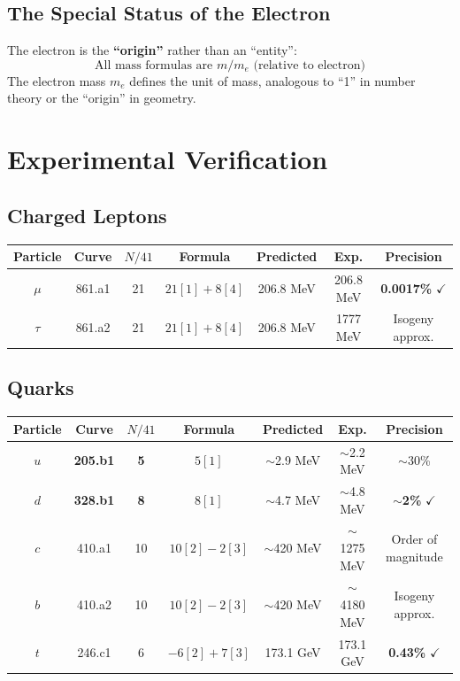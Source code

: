 ﻿\documentclass[11pt,a4paper]{article}
\begin{document}
\subsection{The Special Status of the Electron}

The electron is the \textbf{``origin''} rather than an ``entity'':
\begin{equation}
    \text{All mass formulas are } m/m_e \text{ (relative to electron)}
\end{equation}
The electron mass $m_e$ defines the unit of mass, analogous to ``1'' in number theory or the ``origin'' in geometry.

\section{Experimental Verification}

\subsection{Charged Leptons}

\begin{table}[h]
\centering
\begin{tabular}{@{}ccccccc@{}}
\toprule
\textbf{Particle} & \textbf{Curve} & $N/41$ & \textbf{Formula} & \textbf{Predicted} & \textbf{Exp.} & \textbf{Precision} \\
\midrule
$\mu$ & 861.a1 & 21 & $21[1]+8[4]$ & 206.8 MeV & 206.8 MeV & \textbf{0.0017\%} $\checkmark$ \\
$\tau$ & 861.a2 & 21 & $21[1]+8[4]$ & 206.8 MeV & 1777 MeV & Isogeny approx. \\
\bottomrule
\end{tabular}
\end{table}

\subsection{Quarks}

\begin{table}[h]
\centering
\begin{tabular}{@{}ccccccc@{}}
\toprule
\textbf{Particle} & \textbf{Curve} & $N/41$ & \textbf{Formula} & \textbf{Predicted} & \textbf{Exp.} & \textbf{Precision} \\
\midrule
$u$ & \textbf{205.b1} & \textbf{5} & $5[1]$ & $\sim$2.9 MeV & $\sim$2.2 MeV & $\sim$30\% \\
$d$ & \textbf{328.b1} & \textbf{8} & $8[1]$ & $\sim$4.7 MeV & $\sim$4.8 MeV & \textbf{$\sim$2\%} $\checkmark$ \\
$c$ & 410.a1 & 10 & $10[2]-2[3]$ & $\sim$420 MeV & $\sim$1275 MeV & Order of magnitude \\
$b$ & 410.a2 & 10 & $10[2]-2[3]$ & $\sim$420 MeV & $\sim$4180 MeV & Isogeny approx. \\
$t$ & 246.c1 & 6 & $-6[2]+7[3]$ & 173.1 GeV & 173.1 GeV & \textbf{0.43\%} $\checkmark$ \\
\bottomrule
\end{tabular}
\end{table}
\end{document}
